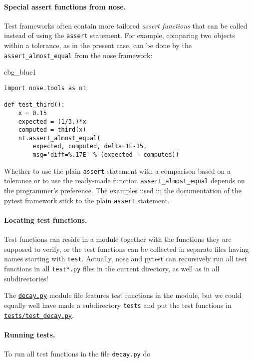 \documentclass[graybox,sectrefs,envcountresetchap,open=right,final]{svmonodo}
\newenvironment{_cod_tight}[1]{
   \def\FrameCommand{\colorbox{#1}}
   \FrameRule0.6pt\MakeFramed {\FrameRestore}\vskip3mm}
   {\vskip0mm\endMakeFramed}
\newenvironment{cod}[1]{
\bgroup\rmfamily
\fboxsep=0mm\relax
\begin{_cod_tight}{#1}
\list{}{\parsep=-2mm\parskip=0mm\topsep=0pt\leftmargin=2mm
\rightmargin=2\leftmargin\leftmargin=4pt\relax}
\item\relax}
{\endlist\end{_cod_tight}\egroup}
\begin{document}
\paragraph{Special assert functions from nose.}
Test frameworks often contain more tailored
\emph{assert functions} that can be called instead of using the \texttt{assert}
statement. For example, comparing two objects within
a tolerance, as in the present
case, can be done by the \Verb!assert_almost_equal! from the nose
framework:

\begin{cod}{cbg_blue1}\begin{Verbatim}[numbers=none,fontsize=\fontsize{9pt}{9pt},baselinestretch=0.95,xleftmargin=2mm]
import nose.tools as nt

def test_third():
    x = 0.15
    expected = (1/3.)*x
    computed = third(x)
    nt.assert_almost_equal(
        expected, computed, delta=1E-15,
        msg='diff=%.17E' % (expected - computed))
\end{Verbatim}
\end{cod}
\noindent

Whether to use the plain \texttt{assert} statement with a comparison based on
a tolerance or to use the ready-made function \Verb!assert_almost_equal!
depends on the programmer's preference. The examples used in the
documentation of the pytest framework stick to the plain \texttt{assert}
statement.

\paragraph{Locating test functions.}
Test functions can reside in a module together with the functions they
are supposed to verify, or the test functions can be collected in
separate files having names starting with \texttt{test}. Actually,
nose and pytest can recursively run all test functions
in all \texttt{test*.py}
files in the current directory, as well as in all subdirectories!

The \href{{http://tinyurl.com/ofkw6kc/softeng/decay.py}}{\nolinkurl{decay.py}} module file features
test functions in the module, but we could equally well have made
a subdirectory \texttt{tests} and put the test functions in
\href{{http://tinyurl.com/ofkw6kc/softeng/tests/test_decay.py}}{\nolinkurl{tests/test_decay.py}}.

\paragraph{Running tests.}
To run all test functions in the file \texttt{decay.py} do
\end{document}
